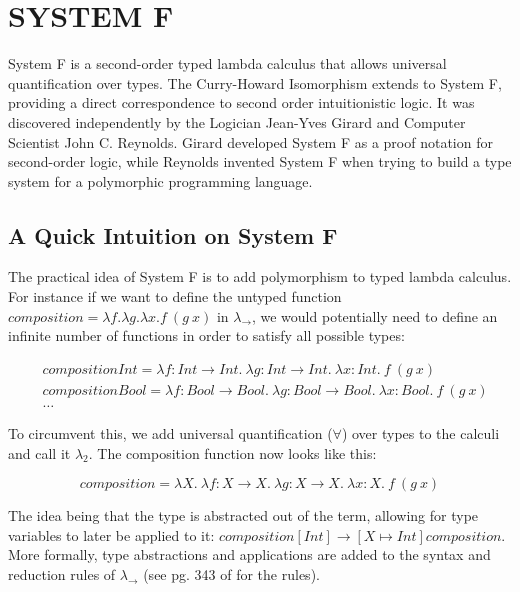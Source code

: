 \chapter{SYSTEM F} \label{ch:systemf}
System F is a second-order typed lambda calculus that allows universal quantification over types. The Curry-Howard Isomorphism extends to System F, providing a direct correspondence to second order intuitionistic logic. It was discovered independently by the Logician Jean-Yves Girard and Computer Scientist John C. Reynolds. Girard developed System F as a proof notation for second-order logic, while Reynolds invented System F when trying to build a type system for a polymorphic programming language. \cite{CHnotes}

\section{A Quick Intuition on System F}
The practical idea of System F is to add polymorphism to typed lambda calculus. For instance if we want to define the untyped function $composition = \lambda f. \lambda g. \lambda x. f\ (g\ x) $ in $\lambda_{\rightarrow}$, we would potentially need to define an infinite number of functions in order to satisfy all possible types:
\begin{spacing}{1}
\begin{equation*}
  \begin{aligned}
    & compositionInt = \lambda f:Int \rightarrow Int.\ \lambda g:Int \rightarrow Int.\ \lambda x:Int.\ f\ (g\ x) \\
    & compositionBool = \lambda f:Bool \rightarrow Bool.\ \lambda g:Bool \rightarrow Bool.\ \lambda x:Bool.\ f\ (g\ x)\\
    & \ldots
  \end{aligned}
\end{equation*}
\end{spacing}
\vspace{.1in}


To circumvent this, we add universal quantification ($\forall $) over types to the calculi and call it $\lambda_{2} $. The composition function now looks like this:
\begin{spacing}{1}
\begin{equation*}
  composition = \lambda X.\ \lambda f:X \rightarrow X.\ \lambda g:X \rightarrow X.\ \lambda x:X.\ f\ (g\ x)
\end{equation*}
\end{spacing}
\vspace{.1in}
The idea being that the type is abstracted out of the term, allowing for type variables to later be applied to it: $composition [Int] \rightarrow [X \mapsto Int] composition $. More formally, type abstractions and applications are added to the syntax and reduction rules of $\lambda_{\rightarrow} $ (see pg. 343 of \cite{tapl} for the rules).

